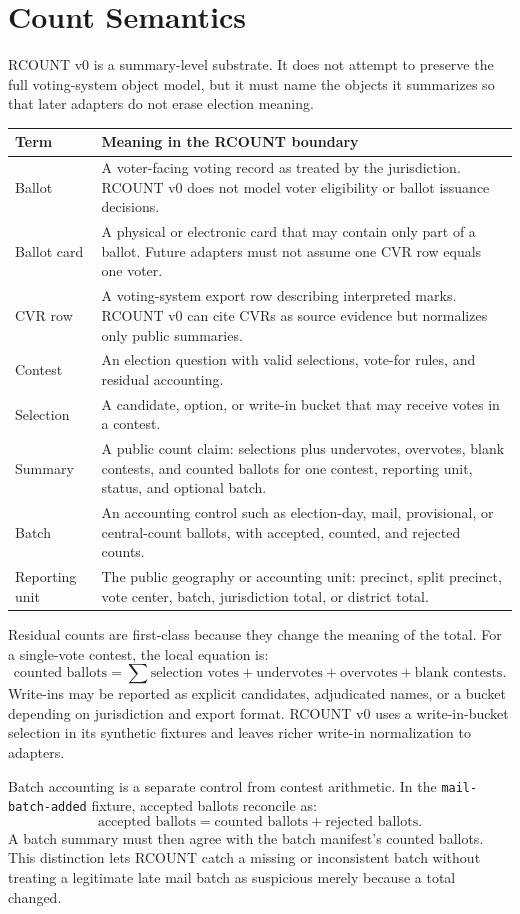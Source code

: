 \section{Count Semantics}

RCOUNT v0 is a summary-level substrate. It does not attempt to preserve the
full voting-system object model, but it must name the objects it summarizes so
that later adapters do not erase election meaning.

\begin{center}
\small
\begin{tabularx}{\textwidth}{lX}
\toprule
Term & Meaning in the RCOUNT boundary \\
\midrule
Ballot & A voter-facing voting record as treated by the jurisdiction. RCOUNT v0 does not model voter eligibility or ballot issuance decisions. \\
Ballot card & A physical or electronic card that may contain only part of a ballot. Future adapters must not assume one CVR row equals one voter. \\
CVR row & A voting-system export row describing interpreted marks. RCOUNT v0 can cite CVRs as source evidence but normalizes only public summaries. \\
Contest & An election question with valid selections, vote-for rules, and residual accounting. \\
Selection & A candidate, option, or write-in bucket that may receive votes in a contest. \\
Summary & A public count claim: selections plus undervotes, overvotes, blank contests, and counted ballots for one contest, reporting unit, status, and optional batch. \\
Batch & An accounting control such as election-day, mail, provisional, or central-count ballots, with accepted, counted, and rejected counts. \\
Reporting unit & The public geography or accounting unit: precinct, split precinct, vote center, batch, jurisdiction total, or district total. \\
\bottomrule
\end{tabularx}
\end{center}

Residual counts are first-class because they change the meaning of the total.
For a single-vote contest, the local equation is:
\[
  \text{counted ballots} =
  \sum \text{selection votes} + \text{undervotes} + \text{overvotes}
  + \text{blank contests}.
\]
Write-ins may be reported as explicit candidates, adjudicated names, or a
bucket depending on jurisdiction and export format. RCOUNT v0 uses a
write-in-bucket selection in its synthetic fixtures and leaves richer write-in
normalization to adapters.

Batch accounting is a separate control from contest arithmetic. In the
\texttt{mail-batch-added} fixture, accepted ballots reconcile as:
\[
  \text{accepted ballots} = \text{counted ballots} + \text{rejected ballots}.
\]
A batch summary must then agree with the batch manifest's counted ballots. This
distinction lets RCOUNT catch a missing or inconsistent batch without treating a
legitimate late mail batch as suspicious merely because a total changed.

